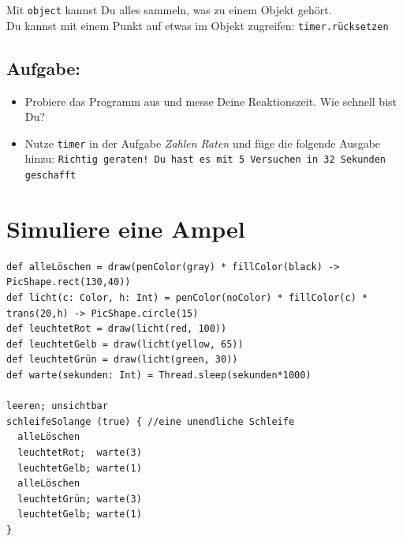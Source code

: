Mit \lstinline{object} kannst Du alles sammeln, was zu einem Objekt gehört.\\
Du kannst mit einem Punkt auf etwas im Objekt zugreifen: \lstinline{timer.rücksetzen}
\section*{\color{BrickRed}Aufgabe:}


\begin{itemize}

\item {Probiere das Programm aus und messe Deine Reaktionszeit. Wie schnell bist Du?}
\item {Nutze \lstinline{timer} in der Aufgabe {\it Zahlen Raten} und füge die folgende Ausgabe hinzu: \lstinline{Richtig geraten! Du hast es mit 5 Versuchen in 32 Sekunden geschafft}}

\end{itemize}


\chapter{Simuliere eine Ampel}
  

\begin{lstlisting}[basicstyle={\ttfamily\fontsize{14}{17}\selectfont},numbers=none]
def alleLöschen = draw(penColor(gray) * fillColor(black) -> PicShape.rect(130,40))
def licht(c: Color, h: Int) = penColor(noColor) * fillColor(c) * trans(20,h) -> PicShape.circle(15)
def leuchtetRot = draw(licht(red, 100))
def leuchtetGelb = draw(licht(yellow, 65))
def leuchtetGrün = draw(licht(green, 30))
def warte(sekunden: Int) = Thread.sleep(sekunden*1000)

leeren; unsichtbar  
schleifeSolange (true) { //eine unendliche Schleife
  alleLöschen
  leuchtetRot;  warte(3)
  leuchtetGelb; warte(1) 
  alleLöschen
  leuchtetGrün; warte(3)
  leuchtetGelb; warte(1)
}
\end{lstlisting}
        
